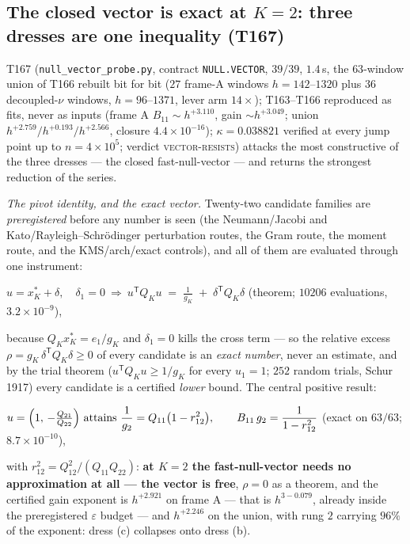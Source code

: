 \documentclass[11pt,a4paper]{article}
\begin{document}
\subsection{The closed vector is exact at $K=2$: three dresses are one
inequality (T167)}
T167 (\texttt{null\_vector\_probe.py}, contract \texttt{NULL.VECTOR},
$39/39$, $1.4$\,s, the $63$-window union of T166 rebuilt bit for bit ($27$
frame-A windows $h=142$--$1320$ plus $36$ decoupled-$\nu$ windows,
$h=96$--$1371$, lever arm $14\times$); T163--T166 reproduced as fits, never
as inputs (frame A $B_{11}\sim h^{+3.110}$, gain $\sim h^{+3.049}$; union
$h^{+2.759}/h^{+0.193}/h^{+2.566}$, closure $4.4\times10^{-16}$);
$\kappa=0.038821$ verified at every jump point up to $n=4\times10^{5}$;
verdict \textsc{vector-resists}) attacks the most constructive of the three
dresses --- the closed fast-null-vector --- and returns the strongest
reduction of the series.

\emph{The pivot identity, and the exact vector.} Twenty-two candidate
families are \emph{preregistered} before any number is seen (the
Neumann/Jacobi and Kato/Rayleigh--Schr\"odinger perturbation routes, the
Gram route, the moment route, and the KMS/arch/exact controls), and all of
them are evaluated through one instrument:
\begin{keyeq}$\displaystyle
u=x^*_K+\delta,\quad\delta_1=0\ \Longrightarrow\
u^{\mathsf T}Q_Ku\;=\;\frac1{g_K}\;+\;\delta^{\mathsf T}Q_K\delta$
\quad(theorem; $10206$ evaluations, $3.2\times10^{-9}$),
\end{keyeq}
\noindent because $Q_Kx^*_K=e_1/g_K$ and $\delta_1=0$ kills the cross term
--- so the relative excess $\rho=g_K\,\delta^{\mathsf T}Q_K\delta\ge0$ of
every candidate is an \emph{exact number}, never an estimate, and by the
trial theorem ($u^{\mathsf T}Q_Ku\ge1/g_K$ for every $u_1=1$; $252$ random
trials, Schur 1917) every candidate is a certified \emph{lower} bound. The
central positive result:
\begin{keyeq}$\displaystyle
u=\Bigl(1,\,-\tfrac{Q_{21}}{Q_{22}}\Bigr)\ \text{attains}\
\frac1{g_2}=Q_{11}\bigl(1-r_{12}^2\bigr),\qquad
B_{11}\,g_2=\frac1{1-r_{12}^2}$
\quad(exact on $63/63$; $8.7\times10^{-10}$),
\end{keyeq}
\noindent with $r_{12}^2=Q_{12}^2/(Q_{11}Q_{22})$: \textbf{at $K=2$ the
fast-null-vector needs no approximation at all --- the vector is free},
$\rho=0$ as a theorem, and the certified gain exponent is $h^{+2.921}$ on
frame A --- that is $h^{3-0.079}$, already inside the preregistered
$\varepsilon$ budget --- and $h^{+2.246}$ on the union, with rung $2$
carrying $96\%$ of the exponent: dress (c) collapses onto dress (b).
\end{document}
